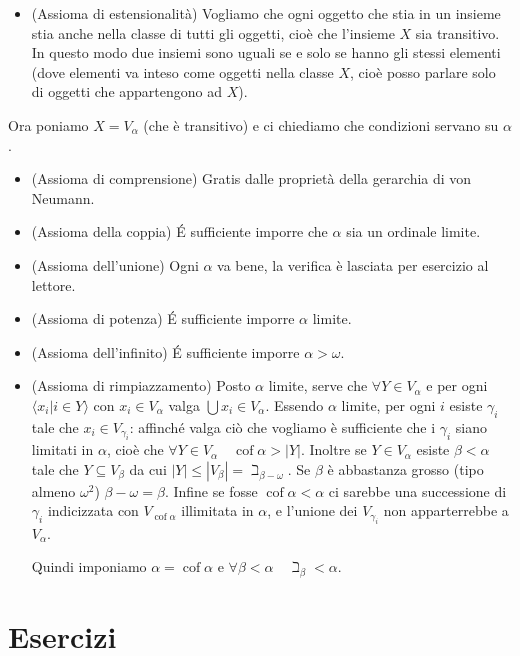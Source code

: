 \documentclass[a4paper,10pt,oneside]{article}
\DeclareMathOperator{\cof}{cof}
\newcommand{\abs}[1]{\left|#1\right|}
\theoremstyle{plain}
\theoremstyle{definition}
\theoremstyle{remark}
\begin{document}
\begin{itemize}
 \item (Assioma di estensionalità) Vogliamo che ogni oggetto che stia in un insieme stia anche nella classe di tutti gli oggetti, cioè che l'insieme $X$ sia transitivo. In questo modo due insiemi sono uguali se e solo se hanno gli stessi elementi (dove elementi va inteso come oggetti nella classe $X$, cioè posso parlare solo di oggetti che appartengono ad $X$).
\end{itemize}
Ora poniamo $X=V_\alpha$ (che è transitivo) e ci chiediamo che condizioni servano su $\alpha$.
\begin{itemize}
 \item (Assioma di comprensione) Gratis dalle proprietà della gerarchia di von Neumann.
 \item (Assioma della coppia) \'E sufficiente imporre che $\alpha$ sia un ordinale limite.
 \item (Assioma dell'unione) Ogni $\alpha$ va bene, la verifica è lasciata per esercizio al lettore.
 \item (Assioma di potenza) \'E sufficiente imporre $\alpha$ limite.
 \item (Assioma dell'infinito) \'E sufficiente imporre $\alpha>\omega$.
 \item (Assioma di rimpiazzamento) Posto $\alpha$ limite, serve che $\forall Y\in V_\alpha$ e per ogni $\langle x_i | i\in Y\rangle$ con $x_i \in V_\alpha$ valga $\bigcup x_i\in V_\alpha$. Essendo $\alpha$ limite, per ogni $i$ esiste $\gamma_i$ tale che $x_i\in V_{\gamma_i}$: affinché valga ciò che vogliamo è sufficiente che i $\gamma_i$ siano limitati in $\alpha$, cioè che $\forall Y\in V_\alpha \quad \cof\alpha>\abs{Y}$. Inoltre se $Y\in V_\alpha$ esiste $\beta<\alpha$ tale che $Y\subseteq V_\beta$ da cui $\abs{Y}\le\abs{V_\beta}=\beth_{\beta-\omega}$. Se $\beta$ è abbastanza grosso (tipo almeno $\omega^2$) $\beta-\omega=\beta$. Infine se fosse $\cof\alpha<\alpha$ ci sarebbe una successione di $\gamma_i$ indicizzata con $V_{\cof\alpha}$ illimitata in $\alpha$, e l'unione dei $V_{\gamma_i}$ non apparterrebbe a $V_\alpha$.

Quindi imponiamo $\alpha=\cof\alpha$ e $\forall\beta<\alpha\quad\beth_\beta<\alpha$.
\end{itemize}

\section{Esercizi}
\end{document}
